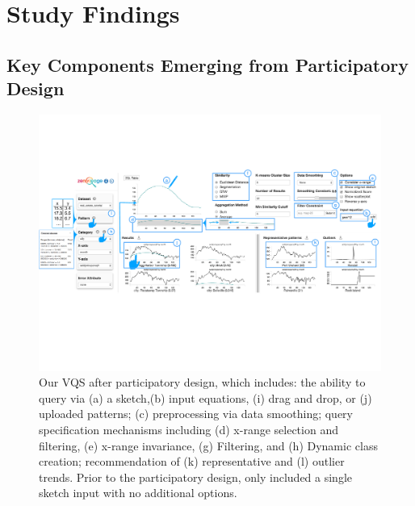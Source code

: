 \section{Study Findings}
\subsection{Key Components Emerging from Participatory Design\label{pd_findings}}
\begin{figure}[t!]
\centering
\vspace{-15pt}
\includegraphics[width=\linewidth]{figures/system.pdf} %
\vspace{-5pt}\caption{Our VQS after participatory design, which includes: the ability to query via (a) a sketch,(b) input equations, (i) drag and drop, or (j) uploaded patterns; (c) preprocessing via data smoothing; query specification mechanisms including (d) x-range selection and filtering, (e) x-range invariance, (g) Filtering, and (h) Dynamic class creation; recommendation of (k) representative and (l) outlier trends. Prior to the participatory design, \zv only included a single sketch input with no additional options.}
\label{zvOverview}
\vspace{-14pt}
\end{figure}

